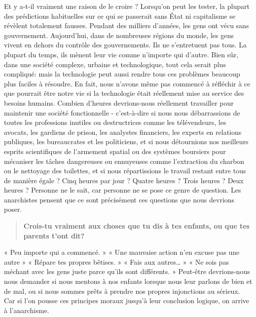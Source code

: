 Et y a-t-il vraiment une raison de le croire ? Lorsqu'on peut les tester, la plupart des prédictions habituelles sur ce qui se passerait sans État ni capitalisme se révèlent totalement fausses. Pendant des milliers d'années, les gens ont vécu sans gouvernement. Aujourd'hui, dans de nombreuses régions du monde, les gens vivent en dehors du contrôle des gouvernements. Ils ne s'entretuent pas tous. La plupart du temps, ils mènent leur vie comme n'importe qui d'autre. Bien sûr, dans une société complexe, urbaine et technologique, tout cela serait plus compliqué: mais la technologie peut aussi rendre tous ces problèmes beaucoup plus faciles à résoudre. En fait, nous n'avons même pas commencé à réfléchir à ce que pourrait être notre vie si la technologie était réellement mise au service des besoins humains. Combien d'heures devrions-nous réellement travailler pour maintenir une société fonctionnelle - c'est-à-dire si nous nous débarrassions de toutes les professions inutiles ou destructrices comme les télévendeurs, les avocats, les gardiens de prison, les analystes financiers, les experts en relations publiques, les bureaucrates et les politiciens, et si nous détournions nos meilleurs esprits scientifiques de l'armement spatial ou des systèmes boursiers pour mécaniser les tâches dangereuses ou ennuyeuses comme l'extraction du charbon ou le nettoyage des toilettes, et si nous répartissions le travail restant entre tous de manière égale ? Cinq heures par jour ? Quatre heures ? Trois heures ? Deux heures ? Personne ne le sait, car personne ne se pose ce genre de question. Les anarchistes pensent que ce sont précisément ces questions que nous devrions poser.

\begin{quotation}
\textbf{Crois-tu vraiment aux choses que tu dis à tes enfants, ou que tes parents t’ont dit?}
\end{quotation}

« Peu importe qui a commencé. » « Une mauvaise action n'en excuse pas une autre » « Répare tes propres bêtises. » « Fais aux autres… » « Ne sois pas méchant avec les gens juste parce qu'ils sont différents. » Peut-être devrions-nous nous demander si nous mentons à nos enfants lorsque nous leur parlons de bien et de mal, ou si nous sommes prêts à prendre nos propres injonctions au sérieux. Car si l'on pousse ces principes moraux jusqu'à leur conclusion logique, on arrive à l'anarchisme.

